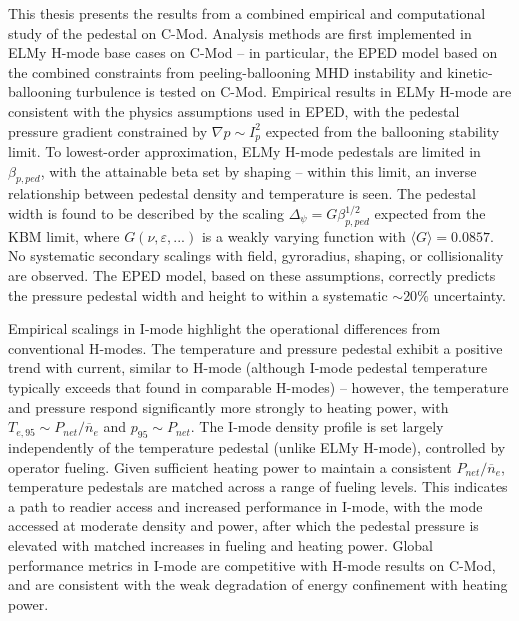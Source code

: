 This thesis presents the results from a combined empirical and computational study of the pedestal on C-Mod.  Analysis methods are first implemented in ELMy H-mode base cases on C-Mod -- in particular, the EPED model based on the combined constraints from peeling-ballooning MHD instability and kinetic-ballooning turbulence is tested on C-Mod.  Empirical results in ELMy H-mode are consistent with the physics assumptions used in EPED, with the pedestal pressure gradient constrained by $\nabla p \sim I_p^2$ expected from the ballooning stability limit.  To lowest-order approximation, ELMy H-mode pedestals are limited in $\beta_{p,ped}$, with the attainable beta set by shaping -- within this limit, an inverse relationship between pedestal density and temperature is seen.  The pedestal width is found to be described by the scaling  $\Delta_\psi = G \beta_{p,ped}^{1/2}$ expected from the KBM limit, where $G(\nu,\varepsilon,...)$ is a weakly varying function with $\langle G \rangle = 0.0857$.  No systematic secondary scalings with field, gyroradius, shaping, or collisionality are observed.  The EPED model, based on these assumptions, correctly predicts the pressure pedestal width and height to within a systematic $\sim 20\%$ uncertainty.

Empirical scalings in I-mode highlight the operational differences from conventional H-modes.  The temperature and pressure pedestal exhibit a positive trend with current, similar to H-mode (although I-mode pedestal temperature typically exceeds that found in comparable H-modes) -- however, the temperature and pressure respond significantly more strongly to heating power, with $T_{e,95} \sim P_{net}/\overline{n}_e$ and $p_{95} \sim P_{net}$.  The I-mode density profile is set largely independently of the temperature pedestal (unlike ELMy H-mode), controlled by operator fueling.  Given sufficient heating power to maintain a consistent $P_{net}/\overline{n}_e$, temperature pedestals are matched across a range of fueling levels.  This indicates a path to readier access and increased performance in I-mode, with the mode accessed at moderate density and power, after which the pedestal pressure is elevated with matched increases in fueling and heating power.  Global performance metrics in I-mode are competitive with H-mode results on C-Mod, and are consistent with the weak degradation of energy confinement with heating power.

